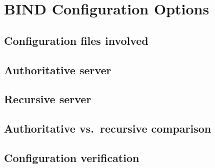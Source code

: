 \section{BIND Configuration Options}\label{sec:configuration}


\subsection{Configuration files involved}\label{sec:config-files}

\subsection{Authoritative server}\label{sec:config-authoritative}

\subsection{Recursive server}\label{sec:config-recursive}

\subsection{Authoritative vs.\ recursive comparison}\label{sec:config-comparison}

\subsection{Configuration verification}\label{sec:config-verification}
